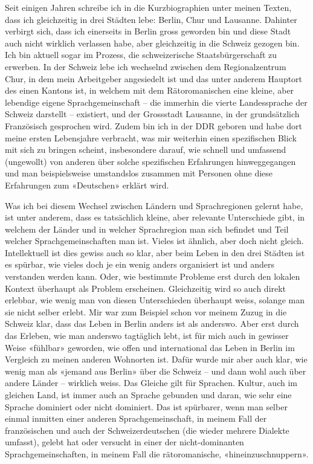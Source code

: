 \documentclass[a4paper,
fontsize=11pt,
oneside,
numbers=noperiodatend,
parskip=half-,
bibliography=totoc,
final
]{scrartcl}
\begin{document}
Seit einigen Jahren schreibe ich in die Kurzbiographien unter meinen
Texten, dass ich gleichzeitig in drei Städten lebe: Berlin, Chur und
Lausanne. Dahinter verbirgt sich, dass ich einerseits in Berlin gross
geworden bin und diese Stadt auch nicht wirklich verlassen habe, aber
gleichzeitig in die Schweiz gezogen bin. Ich bin aktuell sogar im
Prozess, die schweizerische Staatsbürgerschaft zu erwerben. In der
Schweiz lebe ich wechselnd zwischen dem Regionalzentrum Chur, in dem
mein Arbeitgeber angesiedelt ist und das unter anderem Hauptort des
einen Kantons ist, in welchem mit dem Rätoromanischen eine kleine, aber
lebendige eigene Sprachgemeinschaft -- die immerhin die vierte
Landessprache der Schweiz darstellt -- existiert, und der Grossstadt
Lausanne, in der grundsätzlich Französisch gesprochen wird. Zudem bin
ich in der DDR geboren und habe dort meine ersten Lebensjahre verbracht,
was mir weiterhin einen spezifischen Blick mit sich zu bringen scheint,
insbesondere darauf, wie schnell und umfassend (ungewollt) von anderen
über solche spezifischen Erfahrungen hinweggegangen und man
beispielsweise umstandslos zusammen mit Personen ohne diese Erfahrungen
zum «Deutschen» erklärt wird.

Was ich bei diesem Wechsel zwischen Ländern und Sprachregionen gelernt
habe, ist unter anderem, dass es tatsächlich kleine, aber relevante
Unterschiede gibt, in welchem der Länder und in welcher Sprachregion man
sich befindet und Teil welcher Sprachgemeinschaften man ist. Vieles ist
ähnlich, aber doch nicht gleich. Intellektuell ist dies gewiss auch so
klar, aber beim Leben in den drei Städten ist es spürbar, wie vieles
doch je ein wenig anders organisiert ist und anders verstanden werden
kann. Oder, wie bestimmte Probleme erst durch den lokalen Kontext
überhaupt als Problem erscheinen. Gleichzeitig wird so auch direkt
erlebbar, wie wenig man von diesen Unterschieden überhaupt weiss,
solange man sie nicht selber erlebt. Mir war zum Beispiel schon vor
meinem Zuzug in die Schweiz klar, dass das Leben in Berlin anders ist
als anderswo. Aber erst durch das Erleben, wie man anderswo tagtäglich
lebt, ist für mich auch in gewisser Weise «fühlbar» geworden, wie offen
und international das Leben in Berlin im Vergleich zu meinen anderen
Wohnorten ist. Dafür wurde mir aber auch klar, wie wenig man als «jemand
aus Berlin» über die Schweiz -- und dann wohl auch über andere Länder --
wirklich weiss. Das Gleiche gilt für Sprachen. Kultur, auch im gleichen
Land, ist immer auch an Sprache gebunden und daran, wie sehr eine
Sprache dominiert oder nicht dominiert. Das ist spürbarer, wenn man
selber einmal inmitten einer anderen Sprachgemeinschaft, in meinem Fall
der französischen und auch der Schweizerdeutschen (die wieder mehrere
Dialekte umfasst), gelebt hat oder versucht in einer der
nicht-dominanten Sprachgemeinschaften, in meinem Fall die
rätoromanische, «hineinzuschnuppern».
\end{document}
